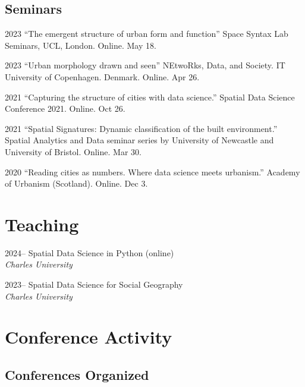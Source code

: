 \documentclass[12pt,a4paper]{report}
\begin{document}
    \subsection*{Seminars}

    \begin{tablist}

        \item[2023] \tab{}\enquote{The emergent structure of urban form and function} Space Syntax Lab Seminars, UCL, London. Online. May 18.
        \item[2023] \tab{}\enquote{Urban morphology drawn and seen} NEtwoRks, Data, and Society. IT University of Copenhagen. Denmark. Online. Apr 26.
        \item[2021] \tab{}\enquote{Capturing the structure of cities with data science.} Spatial Data Science Conference 2021. Online. Oct 26.
        \item[2021] \tab{}\enquote{Spatial Signatures: Dynamic classification of the built environment.} Spatial Analytics and Data seminar series by University of Newcastle and University of Bristol. Online. Mar 30.
        \item[2020] \tab{}\enquote{Reading cities as numbers. Where data science meets urbanism.} Academy of Urbanism (Scotland). Online. Dec 3.

    \end{tablist}

    \section*{Teaching}

    \begin{tablist}

        \item[2024--] \tab{}Spatial Data Science in Python (online) \\
                            \textit{Charles University}
        \item[2023--] \tab{}Spatial Data Science for Social Geography \\
                            \textit{Charles University}

    \end{tablist}


    \section*{Conference Activity}


    \subsection*{Conferences Organized}
\end{document}
